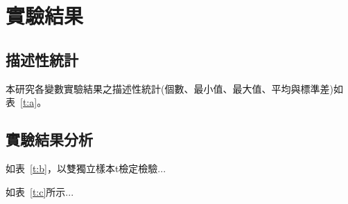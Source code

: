 \chapter{實驗結果}
\label{c:experiment}

\section{描述性統計}

本研究各變數實驗結果之描述性統計(個數、最小值、最大值、平均與標準差)如表~\ref{t:a}。



\section{實驗結果分析}

如表~\ref{t:b}，以雙獨立樣本t檢定檢驗...



如表~\ref{t:c}所示...


